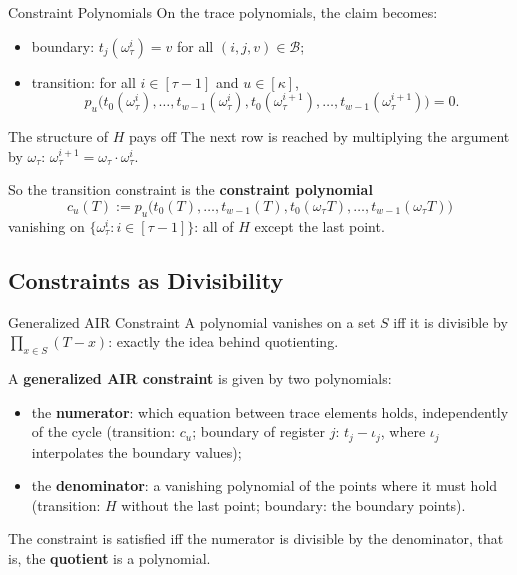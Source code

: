 \documentclass{zkdl-presentation-template}
\begin{document}
    \begin{frame}{Constraint Polynomials}
        On the trace polynomials, the claim becomes:
        \begin{itemize}
            \item boundary: $t_j(\omega_\tau^i) = v$ for all $(i, j, v) \in \mathcal{B}$;
            \item transition: for all $i \in [\tau - 1]$ and $u \in [\kappa]$,
            \begin{equation*}
                p_u\big(t_0(\omega_\tau^i), \ldots, t_{w-1}(\omega_\tau^i), t_0(\omega_\tau^{i+1}), \ldots, t_{w-1}(\omega_\tau^{i+1})\big) = 0.
            \end{equation*}
        \end{itemize}
        \pause

        \begin{remarkblock}{The structure of $H$ pays off}
            The next row is reached by multiplying the argument by $\omega_\tau$: $\omega_\tau^{i+1} = \omega_\tau \cdot \omega_\tau^i$.
        \end{remarkblock}
        \pause

        So the transition constraint is the \textbf{constraint polynomial}
        \begin{equation*}
            c_u(T) := p_u\big(t_0(T), \ldots, t_{w-1}(T), t_0(\omega_\tau T), \ldots, t_{w-1}(\omega_\tau T)\big)
        \end{equation*}
        vanishing on $\{\omega_\tau^i : i \in [\tau - 1]\}$: all of $H$ except the last point.
    \end{frame}

    \subsection{Constraints as Divisibility}

    \begin{frame}{Generalized AIR Constraint}
        A polynomial vanishes on a set $S$ iff it is divisible by $\prod_{x \in S}(T - x)$: exactly the idea behind quotienting.
        \pause

        \begin{definition}
            A \textbf{generalized AIR constraint} is given by two polynomials:
            \begin{itemize}
                \item the \textbf{numerator}: which equation between trace elements holds, independently of the cycle (transition: $c_u$; boundary of register $j$: $t_j - \iota_j$, where $\iota_j$ interpolates the boundary values);
                \item the \textbf{denominator}: a vanishing polynomial of the points where it must hold (transition: $H$ without the last point; boundary: the boundary points).
            \end{itemize}
            The constraint is satisfied iff the numerator is divisible by the denominator, that is, the \textbf{quotient} is a polynomial.
        \end{definition}
    \end{frame}
\end{document}

